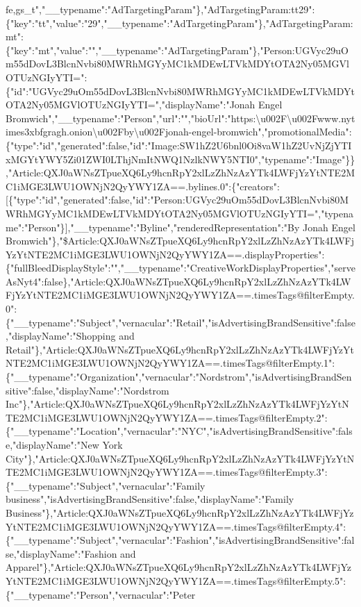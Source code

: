 fe,gs\_t","\_\_typename":"AdTargetingParam"\},"AdTargetingParam:tt29":\{"key":"tt","value":"29","\_\_typename":"AdTargetingParam"\},"AdTargetingParam:mt":\{"key":"mt","value":"","\_\_typename":"AdTargetingParam"\},"Person:UGVyc29uOm55dDovL3BlcnNvbi80MWRhMGYyMC1kMDEwLTVkMDYtOTA2Ny05MGVlOTUzNGIyYTI=":\{"id":"UGVyc29uOm55dDovL3BlcnNvbi80MWRhMGYyMC1kMDEwLTVkMDYtOTA2Ny05MGVlOTUzNGIyYTI=","displayName":"Jonah
Engel
Bromwich","\_\_typename":"Person","url":"","bioUrl":"https:\textbackslash{}u002F\textbackslash{}u002Fwww.nytimes3xbfgragh.onion\textbackslash{}u002Fby\textbackslash{}u002Fjonah-engel-bromwich","promotionalMedia":\{"type":"id","generated":false,"id":"Image:SW1hZ2U6bnl0Oi8vaW1hZ2UvNjZjYTIxMGYtYWY5Zi01ZWI0LThjNmItNWQ1NzlkNWY5NTI0","typename":"Image"\}\},"Article:QXJ0aWNsZTpueXQ6Ly9hcnRpY2xlLzZhNzAzYTk4LWFjYzYtNTE2MC1iMGE3LWU1OWNjN2QyYWY1ZA==.bylines.0":\{"creators":{[}\{"type":"id","generated":false,"id":"Person:UGVyc29uOm55dDovL3BlcnNvbi80MWRhMGYyMC1kMDEwLTVkMDYtOTA2Ny05MGVlOTUzNGIyYTI=","typename":"Person"\}{]},"\_\_typename":"Byline","renderedRepresentation":"By
Jonah Engel
Bromwich"\},"\$Article:QXJ0aWNsZTpueXQ6Ly9hcnRpY2xlLzZhNzAzYTk4LWFjYzYtNTE2MC1iMGE3LWU1OWNjN2QyYWY1ZA==.displayProperties":\{"fullBleedDisplayStyle":"","\_\_typename":"CreativeWorkDisplayProperties","serveAsNyt4":false\},"Article:QXJ0aWNsZTpueXQ6Ly9hcnRpY2xlLzZhNzAzYTk4LWFjYzYtNTE2MC1iMGE3LWU1OWNjN2QyYWY1ZA==.timesTags@filterEmpty.0":\{"\_\_typename":"Subject","vernacular":"Retail","isAdvertisingBrandSensitive":false,"displayName":"Shopping
and
Retail"\},"Article:QXJ0aWNsZTpueXQ6Ly9hcnRpY2xlLzZhNzAzYTk4LWFjYzYtNTE2MC1iMGE3LWU1OWNjN2QyYWY1ZA==.timesTags@filterEmpty.1":\{"\_\_typename":"Organization","vernacular":"Nordstrom","isAdvertisingBrandSensitive":false,"displayName":"Nordstrom
Inc"\},"Article:QXJ0aWNsZTpueXQ6Ly9hcnRpY2xlLzZhNzAzYTk4LWFjYzYtNTE2MC1iMGE3LWU1OWNjN2QyYWY1ZA==.timesTags@filterEmpty.2":\{"\_\_typename":"Location","vernacular":"NYC","isAdvertisingBrandSensitive":false,"displayName":"New
York
City"\},"Article:QXJ0aWNsZTpueXQ6Ly9hcnRpY2xlLzZhNzAzYTk4LWFjYzYtNTE2MC1iMGE3LWU1OWNjN2QyYWY1ZA==.timesTags@filterEmpty.3":\{"\_\_typename":"Subject","vernacular":"Family
business","isAdvertisingBrandSensitive":false,"displayName":"Family
Business"\},"Article:QXJ0aWNsZTpueXQ6Ly9hcnRpY2xlLzZhNzAzYTk4LWFjYzYtNTE2MC1iMGE3LWU1OWNjN2QyYWY1ZA==.timesTags@filterEmpty.4":\{"\_\_typename":"Subject","vernacular":"Fashion","isAdvertisingBrandSensitive":false,"displayName":"Fashion
and
Apparel"\},"Article:QXJ0aWNsZTpueXQ6Ly9hcnRpY2xlLzZhNzAzYTk4LWFjYzYtNTE2MC1iMGE3LWU1OWNjN2QyYWY1ZA==.timesTags@filterEmpty.5":\{"\_\_typename":"Person","vernacular":"Peter
